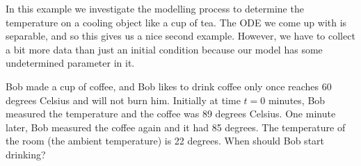 \begin{video}
	In this example we investigate the modelling process to determine the temperature on a cooling object like a cup of tea. The ODE we come up with is separable, and so this gives us a nice second example. However, we have to collect a bit more data than just an initial condition because our model has some undetermined parameter in it. 
\end{video}





\begin{example} \label{sep:coffeeexample}
Bob made a cup of coffee, and
Bob likes to drink coffee only once reaches 60 degrees Celsius and will not burn him.
Initially at time $t=0$ minutes,
Bob measured the temperature and the coffee was 89 degrees Celsius.
One minute later, Bob measured the coffee again and it had 85 degrees.
The temperature of the room (the ambient temperature) is 22 degrees.
When should Bob start drinking?


\end{example}
